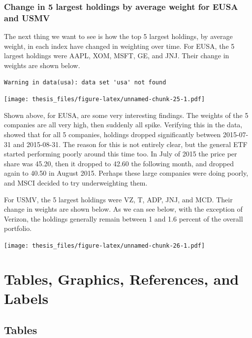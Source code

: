 \documentclass[12pt,twoside]{reedthesis}
\theoremstyle{definition}
\theoremstyle{definition}
\theoremstyle{definition}
\theoremstyle{remark}
\begin{document}
\subsection{Change in 5 largest holdings by average weight for EUSA and
USMV}\label{change-in-5-largest-holdings-by-average-weight-for-eusa-and-usmv}

The next thing we want to see is how the top 5 largest holdings, by
average weight, in each index have changed in weighting over time. For
EUSA, the 5 largest holdings were AAPL, XOM, MSFT, GE, and JNJ. Their
change in weights are shown below.
\begin{verbatim}
Warning in data(usa): data set 'usa' not found
\end{verbatim}
\texttt{[image: thesis\_files/figure-latex/unnamed-chunk-25-1.pdf]}

Shown above, for EUSA, are some very interesting findings. The weights
of the 5 companies are all very high, then suddenly all spike. Verifying
this in the data, showed that for all 5 companies, holdings dropped
significantly between 2015-07-31 and 2015-08-31. The reason for this is
not entirely clear, but the general ETF started performing poorly around
this time too. In July of 2015 the price per share was 45.20, then it
dropped to 42.60 the following month, and dropped again to 40.50 in
August 2015. Perhaps these large companies were doing poorly, and MSCI
decided to try underweighting them.

For USMV, the 5 largest holdings were VZ, T, ADP, JNJ, and MCD. Their
change in weights are shown below. As we can see below, with the
exception of Verizon, the holdings generally remain between 1 and 1.6
percent of the overall portfolio.

\texttt{[image: thesis\_files/figure-latex/unnamed-chunk-26-1.pdf]}

\chapter{Tables, Graphics, References, and Labels}\label{ref-labels}

\section{Tables}\label{tables}
\end{document}

